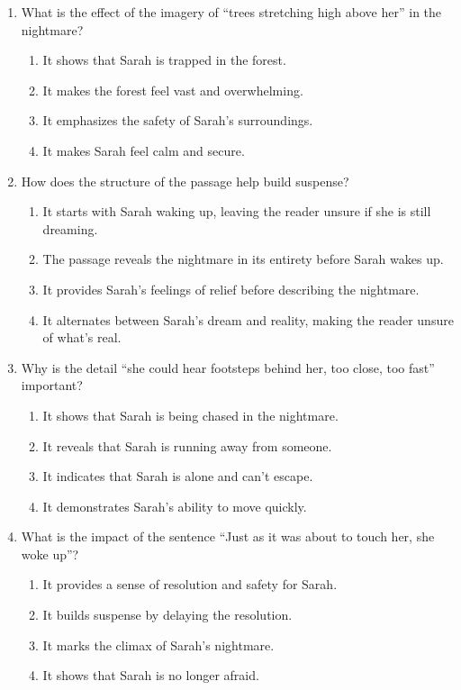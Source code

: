 \documentclass[12pt]{article}
\begin{document}
\begin{enumerate}
    \item What is the effect of the imagery of “trees stretching high above her” in the nightmare?
    \begin{enumerate}[label=\Alph*.]
        \item It shows that Sarah is trapped in the forest.
        \item It makes the forest feel vast and overwhelming.
        \item It emphasizes the safety of Sarah’s surroundings.
        \item It makes Sarah feel calm and secure.
    \end{enumerate}
    \vspace{0.5cm}

    \item How does the structure of the passage help build suspense?
    \begin{enumerate}[label=\Alph*.]
        \item It starts with Sarah waking up, leaving the reader unsure if she is still dreaming.
        \item The passage reveals the nightmare in its entirety before Sarah wakes up.
        \item It provides Sarah’s feelings of relief before describing the nightmare.
        \item It alternates between Sarah’s dream and reality, making the reader unsure of what’s real.
    \end{enumerate}
    \vspace{0.5cm}

    \item Why is the detail “she could hear footsteps behind her, too close, too fast” important?
    \begin{enumerate}[label=\Alph*.]
        \item It shows that Sarah is being chased in the nightmare.
        \item It reveals that Sarah is running away from someone.
        \item It indicates that Sarah is alone and can’t escape.
        \item It demonstrates Sarah’s ability to move quickly.
    \end{enumerate}
    \vspace{0.5cm}

    \item What is the impact of the sentence “Just as it was about to touch her, she woke up”?
    \begin{enumerate}[label=\Alph*.]
        \item It provides a sense of resolution and safety for Sarah.
        \item It builds suspense by delaying the resolution.
        \item It marks the climax of Sarah’s nightmare.
        \item It shows that Sarah is no longer afraid.
    \end{enumerate}
    \vspace{0.5cm}


\end{enumerate}
\end{document}
